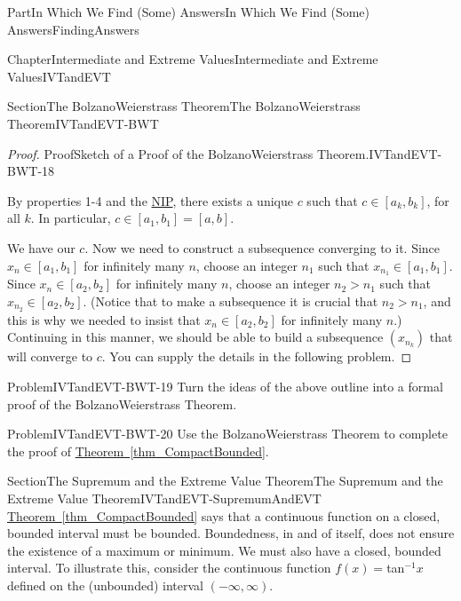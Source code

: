 \documentclass[oneside,10pt,]{book}
\newcommand{\xreffont}{\relax}
\numberwithin{equation}{part}
\begin{document}
\begin{partptx}{Part}{In Which We Find (Some) Answers}{}{In Which We Find (Some) Answers}{}{}{FindingAnswers}
\begin{chapterptx}{Chapter}{Intermediate and Extreme Values}{}{Intermediate and Extreme Values}{}{}{IVTandEVT}
\begin{sectionptx}{Section}{The Bolzano\textendash{}Weierstrass Theorem}{}{The Bolzano\textendash{}Weierstrass Theorem}{}{}{IVTandEVT-BWT}
\begin{proof}{Proof}{Sketch of a Proof of the Bolzano\textendash{}Weierstrass Theorem.}{IVTandEVT-BWT-18}
%
\par
By properties 1-4 and the \hyperref[NIP]{NIP}, there exists a unique \(c\) such that \(c\in[a_k,b_k]\), for all \(k\). In particular, \(c\in[a_1,b_1]=[a,b]\).%
\par
We have our \(c\). Now we need to construct a subsequence converging to it. Since \(x_n\in[a_1,b_1]\) for infinitely many \(n\), choose an integer \(n_1\) such that \(x_{n_1}\in[a_1,b_1]\). Since \(x_n\in[a_2,b_2]\) for infinitely many \(n\), choose an integer \(n_2>n_1\) such that \(x_{n_2}\in[a_2,b_2]\). (Notice that to make a subsequence it is crucial that \(n_2>n_1\), and this is why we needed to insist that \(x_n\in[a_2,b_2]\) for infinitely many \(n\).) Continuing in this manner, we should be able to build a subsequence \(\left(x_{n_k}\right)\) that will converge to \(c\). You can supply the details in the following problem.%
\end{proof}
\begin{problem}{Problem}{}{IVTandEVT-BWT-19}%
Turn the ideas of the above outline into a formal proof of the Bolzano\textendash{}Weierstrass Theorem.%
\end{problem}
\begin{problem}{Problem}{}{IVTandEVT-BWT-20}%
Use the Bolzano\textendash{}Weierstrass Theorem to complete the proof of \hyperref[thm_CompactBounded]{Theorem~{\xreffont\ref{thm_CompactBounded}}}.%
\end{problem}
\end{sectionptx}
%
%
\typeout{************************************************}
\typeout{************************************************}
%
\begin{sectionptx}{Section}{The Supremum and the Extreme Value Theorem}{}{The Supremum and the Extreme Value Theorem}{}{}{IVTandEVT-SupremumAndEVT}
\hyperref[thm_CompactBounded]{Theorem~{\xreffont\ref{thm_CompactBounded}}} says that a continuous function on a closed, bounded interval must be bounded. Boundedness, in and of itself, does not ensure the existence of a maximum or minimum. We must also have a closed, bounded interval. To illustrate this, consider the continuous function \(f(x)=\)tan\(^{-1}x\) defined on the (unbounded) interval \(\left(-\infty,\infty\right)\).%
\begin{image}{0.125}{0.75}{0.125}{}%

\end{image}
\end{sectionptx}
\end{chapterptx}
\end{partptx}
\end{document}
